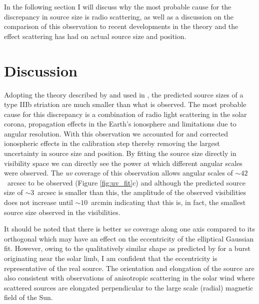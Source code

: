 In the following section I will discuss why the most probable cause for the discrepancy in source size is radio scattering, as well as a discussion on the comparison of this observation to recent developments in the theory and the effect scattering has had on actual source size and position.

\section{Discussion}\label{sec:conclusion}

Adopting the theory described by \cite{Takakura1975} and used in \cite{Kontar2017}, the predicted source sizes of a type IIIb striation are much smaller than what is observed. The most probable cause for this discrepancy is a combination of radio light scattering in the solar corona, propagation effects in the Earth's ionosphere and limitations due to angular resolution.
With this observation we accounted for and corrected ionospheric effects in the calibration step \citep[Section \ref{sec:data} and ][]{DeGasperin2019} thereby removing the largest uncertainty in source size and position. By fitting the source size directly in visibility space we can directly see the power at which different angular scales were observed. The \textit{uv} coverage of this observation allows angular scales of ${\sim} 42$~arcsec to be observed (Figure \ref{fig:uv_fit}c) and although the predicted source size of ${\sim}3$~arcsec is smaller than this, the amplitude of the observed visibilities does not increase until ${\sim} 10$~arcmin indicating that this is, in fact, the smallest source size observed in the visibilities.

It should be noted that there is better \textit{uv} coverage along one axis compared to its orthogonal which may have an effect on the eccentricity of the elliptical Gaussian fit. However, owing to the qualitatively similar shape as predicted by \cite{Kontar2019} for a burst originating near the solar limb, I am confident that the eccentricity is representative of the real source. The orientation and elongation of the source are also consistent with observations of anisotropic scattering in the solar wind \citep{Anantharamaiah1994, Ingale2015} where scattered sources are elongated perpendicular to the large scale (radial) magnetic field of the Sun.

